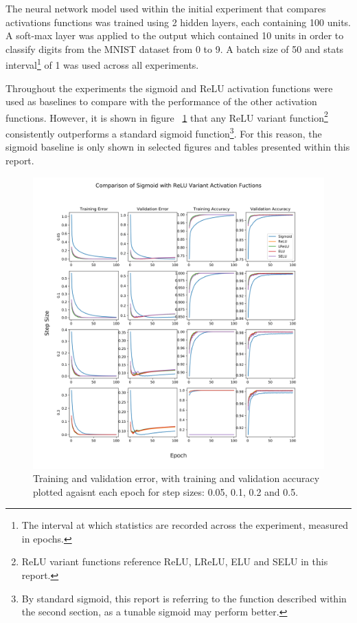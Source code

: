 \documentclass{article}
\begin{document}
The neural network model used within the initial experiment that compares activations functions was trained using 2 hidden layers, each containing 100 units. A soft-max layer was applied to the output which contained 10 units in order to classify digits from the MNIST dataset from 0 to 9. A batch size of 50 and stats interval\footnote{The interval at which statistics are recorded across the experiment, measured in epochs.} of 1 was used across all experiments.

Throughout the experiments the sigmoid and ReLU activation functions were used as baselines to compare with the performance of the other activation functions. However, it is shown in figure ~\ref{fig:sigmoid-vs-relu} that any ReLU variant function\footnote{ReLU variant functions reference ReLU, LReLU, ELU and SELU in this report.} consistently outperforms a standard sigmoid function\footnote{By standard sigmoid, this report is referring to the function described within the second section, as a tunable sigmoid may perform better.}. For this reason, the sigmoid baseline is only shown in selected figures and tables presented within this report.

\begin{figure}[tb]
\vskip 5mm
\begin{center}
\centerline{\includegraphics[width=\columnwidth]{sigmoid_vs_relu_svg}}
\caption{Training and validation error, with training and validation accuracy plotted agaisnt each epoch for step sizes: 0.05, 0.1, 0.2 and 0.5.}
\label{fig:sigmoid-vs-relu}
\end{center}
\vskip -5mm
\end{figure} 
\end{document}
